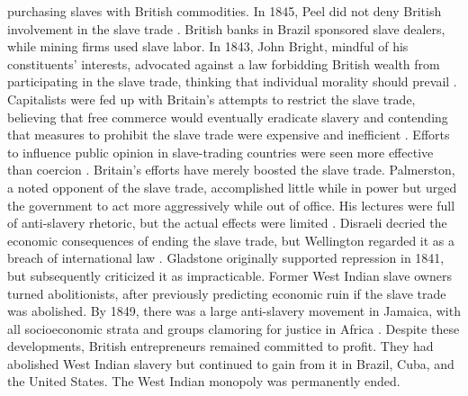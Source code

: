 purchasing slaves with British commodities. In 1845, Peel did not deny British involvement in the slave trade . British banks in Brazil sponsored slave dealers, while mining firms used slave labor. In 1843, John Bright, mindful of his constituents' interests, advocated against a law forbidding British wealth from participating in the slave trade, thinking that individual morality should prevail . Capitalists were fed up with Britain's attempts to restrict the slave trade, believing that free commerce would eventually eradicate slavery  and contending that measures to prohibit the slave trade were expensive and inefficient . Efforts to influence public opinion in slave-trading countries were seen more effective than coercion . Britain's efforts have merely boosted the slave trade. Palmerston, a noted opponent of the slave trade, accomplished little while in power but urged the government to act more aggressively while out of office. His lectures were full of anti-slavery rhetoric, but the actual effects were limited . Disraeli decried the economic consequences of ending the slave trade, but Wellington regarded it as a breach of international law . Gladstone originally supported repression in 1841, but subsequently criticized it as impracticable. Former West Indian slave owners turned abolitionists, after previously predicting economic ruin if the slave trade was abolished. By 1849, there was a large anti-slavery movement in Jamaica, with all socioeconomic strata and groups clamoring for justice in Africa . Despite these developments, British entrepreneurs remained committed to profit. They had abolished West Indian slavery but continued to gain from it in Brazil, Cuba, and the United States. The West Indian monopoly was permanently ended.
